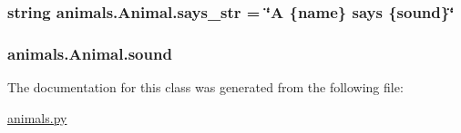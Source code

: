 \subsubsection[{\texorpdfstring{says\+\_\+str}{says_str}}]{\setlength{\rightskip}{0pt plus 5cm}string animals.\+Animal.\+says\+\_\+str = \char`\"{}A \{{\bf name}\} {\bf says} \{{\bf sound}\}\char`\"{}\hspace{0.3cm}{\ttfamily [static]}}\hypertarget{classanimals_1_1_animal_a5de0eae30200f307e56c7d18014d818a}{}\label{classanimals_1_1_animal_a5de0eae30200f307e56c7d18014d818a}
\subsubsection[{\texorpdfstring{sound}{sound}}]{\setlength{\rightskip}{0pt plus 5cm}animals.\+Animal.\+sound}\hypertarget{classanimals_1_1_animal_a1d28d49e92b8c2caa3f843bb66178adc}{}\label{classanimals_1_1_animal_a1d28d49e92b8c2caa3f843bb66178adc}


The documentation for this class was generated from the following file\+:\begin{DoxyCompactItemize}
\item 
\hyperlink{animals_8py}{animals.\+py}\end{DoxyCompactItemize}
